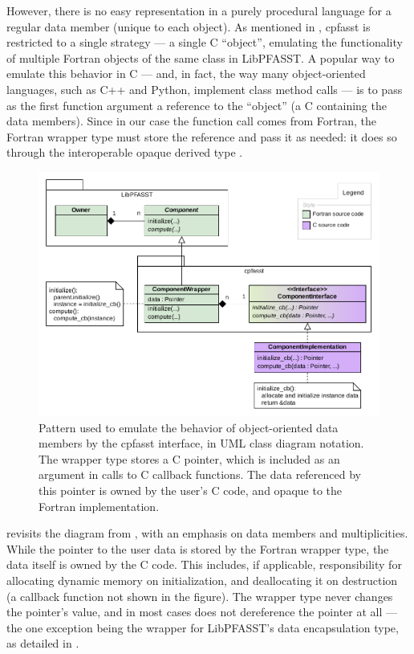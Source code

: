 However, there is no easy representation in a purely procedural language for a regular data member (unique to each object). As mentioned in , cpfasst is restricted to a single strategy --- a single C ``object'', emulating the functionality of multiple Fortran objects of the same class in LibPFASST. A popular way to emulate this behavior in C --- and, in fact, the way many object-oriented languages, such as C++ and Python, implement class method calls --- is to pass as the first function argument a reference to the ``object'' (a C  containing the data members). Since in our case the function call comes from Fortran, the Fortran wrapper type must store the reference and pass it as needed: it does so through the interoperable opaque derived type . 

\begin{figure}[ht]
  \centering
  \includegraphics[width=\textwidth]{images/uml_strategy_data.pdf}
  \caption{Pattern used to emulate the behavior of object-oriented data members by the cpfasst interface, in UML class diagram notation. The wrapper type stores a C pointer, which is included as an argument in calls to C callback functions. The data referenced by this pointer is owned by the user's C code, and opaque to the Fortran implementation.}
  \label{fig:uml_strategy_data}
\end{figure}

 revisits the diagram from , with an emphasis on data members and multiplicities. While the pointer to the user data is stored by the Fortran wrapper type, the data itself is owned by the C code. This includes, if applicable, responsibility for allocating dynamic memory on initialization, and deallocating it on destruction (a callback function not shown in the figure). The wrapper type never changes the pointer's value, and in most cases does not dereference the pointer at all --- the one exception being the wrapper for LibPFASST's data encapsulation type, as detailed in .


